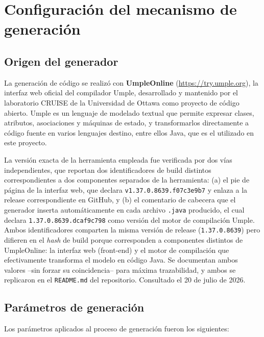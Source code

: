 \documentclass[11pt,a4paper]{article}
\begin{document}
\section{Configuración del mecanismo de generación}

\subsection{Origen del generador}

La generación de código se realizó con \textbf{UmpleOnline}
(\url{https://try.umple.org}), la interfaz web oficial del compilador
Umple, desarrollado y mantenido por el laboratorio CRUISE de la
Universidad de Ottawa como proyecto de código abierto. Umple es un
lenguaje de modelado textual que permite expresar clases, atributos,
asociaciones y máquinas de estado, y transformarlos directamente a
código fuente en varios lenguajes destino, entre ellos Java, que es el
utilizado en este proyecto.

La versión exacta de la herramienta empleada fue verificada por dos
vías independientes, que reportan dos identificadores de build
distintos correspondientes a dos componentes separados de la
herramienta: (a) el pie de página de la interfaz web, que declara
\texttt{v1.37.0.8639.f07c3e9b7} y enlaza a la release correspondiente
en GitHub, y (b) el comentario de cabecera que el generador inserta
automáticamente en cada archivo \texttt{.java} producido, el cual
declara \texttt{1.37.0.8639.dcaf9c798} como versión del motor de
compilación Umple. Ambos identificadores comparten la misma versión
de release (\texttt{1.37.0.8639}) pero difieren en el \emph{hash} de
build porque corresponden a componentes distintos de UmpleOnline: la
interfaz web (front-end) y el motor de compilación que efectivamente
transforma el modelo en código Java. Se documentan ambos valores
--sin forzar su coincidencia-- para máxima trazabilidad, y ambos se
replicaron en el \texttt{README.md} del repositorio. Consultado el 20
de julio de 2026.

\subsection{Parámetros de generación}

Los parámetros aplicados al proceso de generación fueron los
siguientes:
\end{document}
